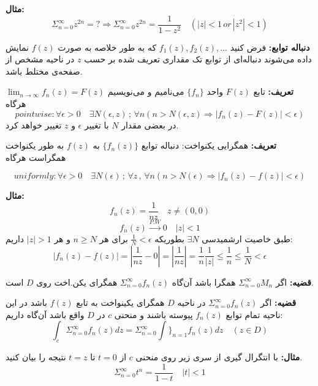 \documentclass[12pt]{report}
\begin{document}
	\textbf{مثال:}
	$$\Sigma_{n = 0}^{\infty} z^{2n} = ? \Rightarrow \Sigma_{n = 0}^{\infty} z^{2n} = \frac{1}{1 - z^2} \quad (|z| < 1 \, or \, |z^2| < 1)$$
	\newline
	
	\textbf{دنباله توابع:}
	فرض کنید
	$f_1(z), f_2(z) , \dots$
	که به طور خلاصه به صورت
	$f(z)$
	نمایش داده می‌شوند دنباله‌ای از توابع تک مقداری تعریف شده بر حسب 
	$z$
	در ناحیه مشخص از صفحه‌ی مختلط باشد.
	\newline
	
	\textbf{تعریف:}
	تابع
	$F(z)$
	واحد
	$\{f_n\}$
	می‌نامیم و می‌نویسیم
	$\lim_{n \to \infty} f_n(z) = F(z)$
	هرگاه
	$$pointwise: \forall \epsilon > 0 \quad \exists N(\epsilon, z) \,;\, \forall n(n > N(\epsilon, z)\Rightarrow |f_n(z) - F(z)| < \epsilon)$$
	در بعضی مقدار 
	$N$
	با تغییر
	$\epsilon$
	و
	$z$
	تغییر خواهد کرد.
	\newline
	
	\textbf{تعریف:}
	همگرایی یکنواخت: دنباله توابع
	$\{f_n(z)\}$
	به 
	$f(z)$
	به طور یکنواخت همگراست هرگاه
	
	$$uniformly  : \forall \epsilon > 0 \quad \exists N(\epsilon) \, ;\, \forall z \,,\,\forall n (n > N(\epsilon) \Rightarrow |f_n(z) - f(z)| < \epsilon)$$
	\newline
	
	\textbf{مثال:}
	$$f_n(z) = \frac{1}{nz} \quad z \neq (0, 0)$$
	$$f_n(z) \overset{P.W}{\rightarrow} 0 \quad |z|<1$$
	طبق خاصیت ارشمیدسی
	$\exists N$
	بطوریکه
	$\frac{1}{N} < \epsilon$
	برای هر 
	$n \geq N$
	و هر
	$|z|> 1$
	داریم:
	$$|f_n(z) - f(z)| = |\frac{1}{nz} - 0| = |\frac{1}{nz}| = \frac{1}{n}\frac{1}{|z|} \leq \frac{1}{n} \leq \frac{1}{N} < \epsilon$$
	\newline
	
	\textbf{قضیه:}
	اگر
	$\Sigma_{n = 0}^{\infty}M_n$
	همگرا باشد آن‌گاه
	$\Sigma_{n = 0}^{\infty}f_n(z)$
	همگرای یکن.اخت روی
	$D$
	است.
	\newline
	
	\textbf{قضیه:}
	اگر
	$\Sigma_{n = 0}^{\infty}f_n(z)$
	در ناحیه 
	$D$
همگرای یکینواخت به تابع
$f(z)$
باشد در این ناحیه تمام توابع
$f_n(z)$
پیوسته باشند و منحنی 
$c$
در 
$D$
واقع باشد آن‌گاه داریم:
$$\int_{c} \Sigma_{n = 0}^{\infty}f_n(z) dz = \Sigma_{n = 0}^{\infty} \int\}_{n  = 1}  f_n(z) dz \quad (z \in D)$$
\newline

\textbf{مثال:}
	با انتگرال گیری از سری زیر روی منحنی 
	$c$
	از
	$t = 0$
	تا
	$t = z$
	نتیجه را بیان کنید.
	$$ \Sigma_{n = 0}^{\infty} t^n = \frac{1}{1 - t} \quad |t| < 1$$
	
\end{document}

